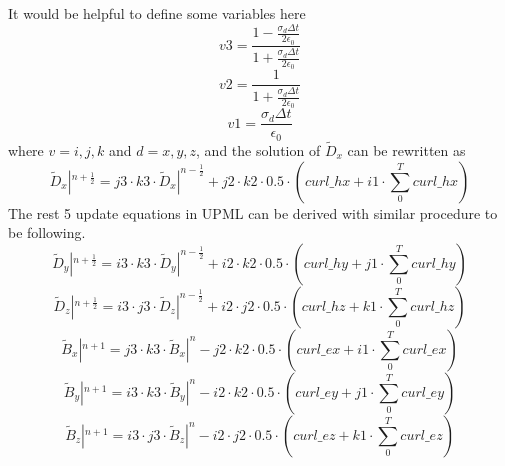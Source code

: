 It would be helpful to define some variables here
\begin{equation}\label{eq:v3}
  v3 = \frac{\displaystyle 1 - \frac{\sigma_d\Delta t}{2\epsilon_0}}{\displaystyle 1 + \frac{\sigma_d\Delta t}{2\epsilon_0}}
\end{equation}
\begin{equation}\label{eq:v2}
  v2 = \frac{1}{\displaystyle 1 + \frac{\sigma_d\Delta t}{2\epsilon_0}}
\end{equation}
\begin{equation}\label{eq:v1}
  v1 = \frac{\sigma_d \Delta t}{\epsilon_0} 
\end{equation}
where $v = i,j,k$ and $d = x,y,z$, and the solution of $\widetilde{D}_x$ can be rewritten as 
\begin{equation}\label{eq:pmldx}
  \widetilde{D}_x|^{n+\frac{1}{2}} = j3 \cdot k3 \cdot \widetilde{D}_x|^{n-\frac{1}{2}} + j2 \cdot k2 \cdot 0.5 \cdot \left( curl\_hx + i1 \cdot \sum_0^T curl\_hx \right)
\end{equation}
The rest 5 update equations in UPML can be derived with similar procedure to be following.
\begin{equation}\label{eq:pmldy}
  \widetilde{D}_y|^{n+\frac{1}{2}} = i3 \cdot k3 \cdot \widetilde{D}_y|^{n-\frac{1}{2}} + i2 \cdot k2 \cdot 0.5 \cdot \left( curl\_hy + j1 \cdot \sum_0^T curl\_hy \right)
\end{equation}
\begin{equation}\label{eq:pmldz}
  \widetilde{D}_z|^{n+\frac{1}{2}} = i3 \cdot j3 \cdot \widetilde{D}_z|^{n-\frac{1}{2}} + i2 \cdot j2 \cdot 0.5 \cdot \left( curl\_hz + k1 \cdot \sum_0^T curl\_hz \right)
\end{equation}
\begin{equation}
  \widetilde{B}_x|^{n+1} = j3 \cdot k3 \cdot \widetilde{B}_x|^{n} - j2 \cdot k2 \cdot 0.5 \cdot \left( curl\_ex + i1 \cdot \sum_0^T curl\_ex \right)
\end{equation}
\begin{equation}
  \widetilde{B}_y|^{n+1} = i3 \cdot k3 \cdot \widetilde{B}_y|^{n} - i2 \cdot k2 \cdot 0.5 \cdot \left( curl\_ey + j1 \cdot \sum_0^T curl\_ey \right)
\end{equation}
\begin{equation}
  \widetilde{B}_z|^{n+1} = i3 \cdot j3 \cdot \widetilde{B}_z|^{n} - i2 \cdot j2 \cdot 0.5 \cdot \left( curl\_ez + k1 \cdot \sum_0^T curl\_ez \right)
\end{equation}






